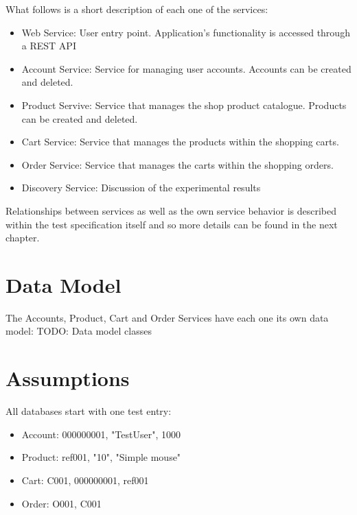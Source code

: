 What follows is a short description of each one of the services:
\begin{itemize}
\item Web Service: User entry point. Application's functionality is accessed through a REST API 
\item Account Service: Service for managing user accounts. Accounts can be created and deleted.
\item Product Servive: Service that manages the shop product catalogue. Products can be created and deleted.
\item Cart Service: Service that manages the products within the shopping carts.
\item Order Service: Service that manages the carts within the shopping orders.
\item Discovery Service: Discussion of the experimental results
\end{itemize}

Relationships between services as well as the own service behavior is described within the test specification itself and so more details can be found in the next chapter. 


\section{Data Model}

The Accounts, Product, Cart and Order Services have each one its own data model:
TODO: Data model classes


\section{Assumptions}

All databases start with one test entry:

\begin{itemize}
\item Account: 000000001, "TestUser", 1000
\item Product: ref001, "10", "Simple mouse"
\item Cart: C001, 000000001, ref001
\item Order: O001, C001
\end{itemize}
